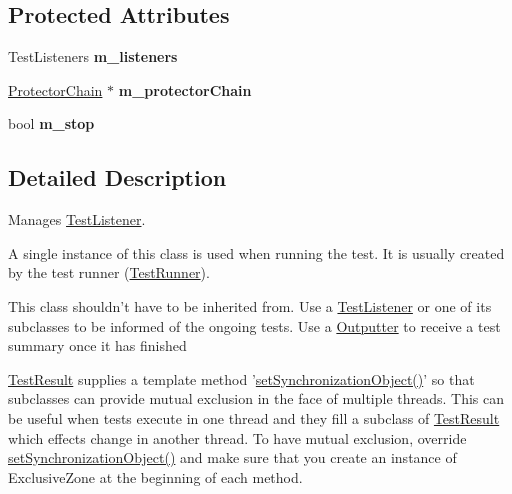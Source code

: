 \subsection*{Protected Attributes}
\begin{DoxyCompactItemize}
\item 
\hypertarget{class_test_result_a6e5daf8393ca6cdd5a9c3b44074b037b}{Test\+Listeners {\bfseries m\+\_\+listeners}}\label{class_test_result_a6e5daf8393ca6cdd5a9c3b44074b037b}

\item 
\hypertarget{class_test_result_a134b98af0bbb837c64031d4501613b35}{\hyperlink{class_protector_chain}{Protector\+Chain} $\ast$ {\bfseries m\+\_\+protector\+Chain}}\label{class_test_result_a134b98af0bbb837c64031d4501613b35}

\item 
\hypertarget{class_test_result_ab8c04c2021b19f0c8d19bf4675f2bd86}{bool {\bfseries m\+\_\+stop}}\label{class_test_result_ab8c04c2021b19f0c8d19bf4675f2bd86}

\end{DoxyCompactItemize}


\subsection{Detailed Description}
Manages \hyperlink{class_test_listener}{Test\+Listener}.

A single instance of this class is used when running the test. It is usually created by the test runner (\hyperlink{class_test_runner}{Test\+Runner}). 

This class shouldn't have to be inherited from. Use a \hyperlink{class_test_listener}{Test\+Listener} or one of its subclasses to be informed of the ongoing tests. Use a \hyperlink{class_outputter}{Outputter} to receive a test summary once it has finished

\hyperlink{class_test_result}{Test\+Result} supplies a template method '\hyperlink{class_synchronized_object_accde14a0c62a66c00ef882d7c7cbca0b}{set\+Synchronization\+Object()}' so that subclasses can provide mutual exclusion in the face of multiple threads. This can be useful when tests execute in one thread and they fill a subclass of \hyperlink{class_test_result}{Test\+Result} which effects change in another thread. To have mutual exclusion, override \hyperlink{class_synchronized_object_accde14a0c62a66c00ef882d7c7cbca0b}{set\+Synchronization\+Object()} and make sure that you create an instance of Exclusive\+Zone at the beginning of each method.

